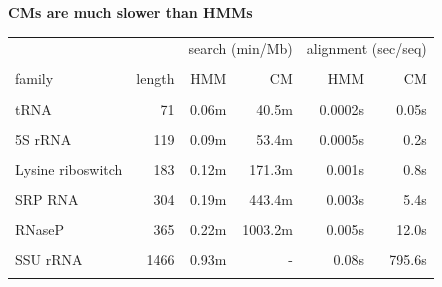 \documentclass[landscape]{slides}
\begin{document}
\begin{slide}
\begin{center}
\textbf{CMs are much slower than HMMs}
\end{center}
\medskip

\begin{center}
\small
\begin{tabular}{lr|rr|rr}
                  &        & \multicolumn{2}{c|}{search (min/Mb)} &   \multicolumn{2}{c}{alignment (sec/seq)}\\ \cline{3-6}
                  &        &        &        &         &  \\
family            & length & HMM    & CM     &    HMM  & CM  \\ \hline
                  &        &        &        &         &  \\
tRNA              & 71     &  0.06m &  40.5m &  0.0002s&   0.05s  \\
                  &        &        &        &         &  \\
5S rRNA           & 119    &  0.09m &  53.4m &  0.0005s&   0.2s  \\
                  &        &        &        &         &  \\
Lysine riboswitch & 183    &  0.12m  & 171.3m &  0.001s &   0.8s \\
                  &        &        &        &         &  \\
SRP RNA           & 304    &  0.19m  & 443.4m &  0.003s &   5.4s \\
                  &        &        &        &         &  \\
RNaseP            & 365    &  0.22m &1003.2m &  0.005s &  12.0s \\
                  &        &        &        &         &  \\
SSU rRNA          & 1466   &  0.93m &    -   &  0.08s  & 795.6s \\
                  &        &        &        &         &  \\
\end{tabular}
\end{center}

\vfill

\end{slide}
\end{document}
